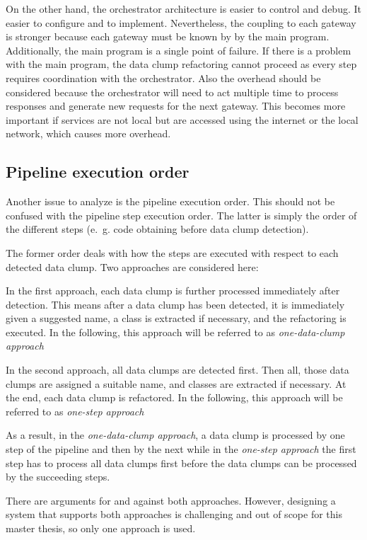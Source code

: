 On the other hand, the orchestrator architecture is easier to control and debug. It easier to configure and to implement. Nevertheless, the coupling to each gateway is stronger because each gateway must be known by by the main program. Additionally, the main program is a single point of failure. If there is a problem with the main program, the data clump refactoring cannot proceed as every step requires coordination with the orchestrator. Also the overhead should be considered because the orchestrator will need to act multiple time to process responses and generate new requests for the next gateway. This becomes more important if services are not local but are accessed using the internet or the local network, which causes more overhead. \cite{orchestration_choreography}


\subsection{Pipeline execution order}\label{sec:pipeline_exec_order}

Another issue to analyze is the pipeline execution order. This should not be confused with the pipeline step execution order. The latter is simply the order of the different steps (e.~g. code obtaining before data clump detection). 

The former order deals with how the steps are executed with respect to each detected data clump. Two approaches are considered here:

In the first approach, each data clump is  further processed immediately after detection. This means after a data clump has been detected, it is immediately given a suggested name, a class is extracted if necessary, and the refactoring is executed. In the following, this approach will be referred to as \textit{one-data-clump approach}

In the second approach, all data clumps are detected first. Then all, those data clumps are assigned a suitable name, and classes are extracted if necessary. At the end, each data clump is refactored. In the following, this approach will be referred to as \textit{one-step approach}

As a result, in the \textit{one-data-clump approach}, a data clump is processed by one step of the pipeline and then by the next while in the \textit{one-step approach} the first step has to process all data clumps first before the data clumps can be processed by the succeeding steps.

There are arguments for and against both approaches. However, designing a system that supports both approaches is challenging and out of scope for this master thesis, so only one approach is used. 


